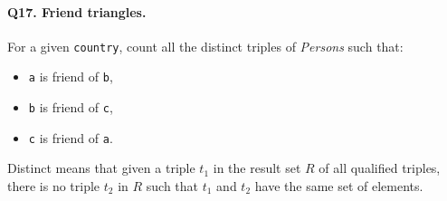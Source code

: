 \paragraph{\textbf{Q17}. Friend triangles.}
For a given \texttt{country}, count all the distinct triples of
\emph{Persons} such that:
\begin{itemize}
\tightlist
\item
  \texttt{a} is friend of \texttt{b},
\item
  \texttt{b} is friend of \texttt{c},
\item
  \texttt{c} is friend of \texttt{a}.
\end{itemize}
Distinct means that given a triple \(t_1\) in the result set \(R\) of
all qualified triples, there is no triple \(t_2\) in \(R\) such that
\(t_1\) and \(t_2\) have the same set of elements.
